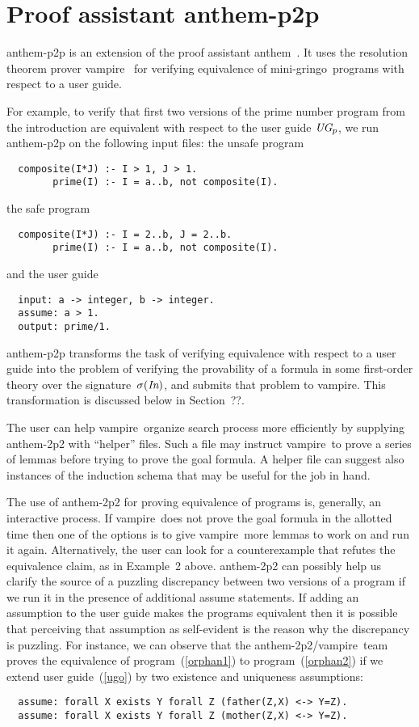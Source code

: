 \documentclass{article}
\def\gringo{{\sc gringo}}
\def\anthem{{\sc anthem}}
\def\vampire{{\sc vampire}}
\begin{document}
{\section{Proof assistant {\sc anthem-p2p}}

{\sc anthem-p2p} is an extension of the proof assistant \anthem\
\cite{fan20}.  It uses the resolution theorem prover \vampire\
\cite{vor13} for verifying equivalence of mini-\gringo\ programs with
respect to a user guide.

For example, to verify that first two versions of the prime number program
from the introduction are equivalent with respect to the user guide
$\emph{UG}_p$, we run {\sc anthem-p2p} on the following input files: the
unsafe program
\begin{verbatim}
  composite(I*J) :- I > 1, J > 1.
        prime(I) :- I = a..b, not composite(I).
\end{verbatim}
the safe program
\begin{verbatim}
  composite(I*J) :- I = 2..b, J = 2..b.
        prime(I) :- I = a..b, not composite(I).
\end{verbatim}
and the user guide
\begin{verbatim}
  input: a -> integer, b -> integer.
  assume: a > 1.
  output: prime/1.
\end{verbatim}
{\sc anthem-p2p} transforms the task of verifying equivalence
with respect to a user guide into the problem of verifying the provability of
a formula in some
first-order theory over the signature~$\sigma(\emph{In})$, and
submits that problem to \vampire.  This transformation is discussed below in
Section~??.

The user can help \vampire\ organize search process more efficiently by
supplying {\sc anthem-2p2} with ``helper'' files.  Such a file may instruct
\vampire\ to prove a series of lemmas before trying to prove the goal formula.
A helper file can suggest also instances of the induction schema that may be
useful for the job in hand.

The use of {\sc anthem-2p2} for proving
equivalence of programs is, generally, an interactive process.
If \vampire\ does not prove the goal formula in the allotted time then one of
the options is to give \vampire\ more lemmas to work on and run it
again.  Alternatively, the user can look for a counterexample that refutes the
equivalence claim, as in Example~2 above.  {\sc anthem-2p2} can possibly
help us clarify the source of a puzzling discrepancy between two versions
of a program if we run it in the presence of additional assume statements.  If
adding an assumption to the user guide makes the programs equivalent then
it is possible that perceiving that assumption as self-evident
is the reason why the discrepancy is puzzling.  For
instance, we can observe that
the {\sc anthem-2p2}/\vampire\ team
proves the equivalence of
program~(\ref{orphan1}) to program~(\ref{orphan2}) if we extend user
guide~(\ref{ugo}) by two existence and uniqueness assumptions:
\begin{verbatim}
  assume: forall X exists Y forall Z (father(Z,X) <-> Y=Z).
  assume: forall X exists Y forall Z (mother(Z,X) <-> Y=Z).
\end{verbatim}

}
\end{document}
